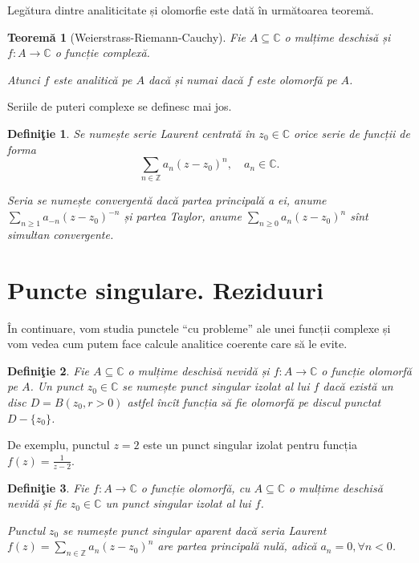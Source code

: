 \documentclass[12pt,a4paper]{article}
\newcommand\qq{\enquote}
\newcommand\seq{\subseteq}
\newcommand\ZZ{\mathbb{Z}}
\newcommand\CC{\mathbb{C}}
\theoremstyle{dotless}
\newtheorem{theorem}{Teorem\u{a}}
\theoremstyle{dotlessdr}
\newtheorem{definition}{Defini\c{t}ie}
\begin{document}
Legătura dintre analiticitate și olomorfie este dată în următoarea teoremă.

\begin{theorem}[Weierstrass-Riemann-Cauchy]\label{thm:wrc}
  Fie $ A \seq \CC $ o mulțime deschisă și $ f : A \to \CC $ o funcție complexă.

  Atunci $ f $ este analitică pe $ A $ dacă și numai dacă $ f $ este olomorfă pe $ A $.
\end{theorem}

Seriile de puteri complexe se definesc mai jos.

\begin{definition}\label{def:laurent}
  Se numește \emph{serie Laurent centrată în $ z_0 \in \CC $} orice serie de funcții
  de forma
  \[
    \sum_{n \in \ZZ} a_n(z - z_0)^n, \quad a_n \in \CC.
  \]

  Seria se numește convergentă dacă \emph{partea principală} a ei, anume
  $ \sum_{n \geq 1} a_{-n}(z - z_0)^{-n} $ și \emph{partea Taylor}, anume
  $ \sum_{n \geq 0} a_n(z - z_0)^n $ sînt simultan convergente.
\end{definition}


\section*{Puncte singulare. Reziduuri}

\indent\indent În continuare, vom studia punctele \qq{cu probleme} ale unei
funcții complexe și vom vedea cum putem face calcule analitice coerente care să le evite.

\begin{definition}\label{def:pc-izolat}
  Fie $ A \seq \CC $ o mulțime deschisă nevidă și $ f : A \to \CC $ o funcție
  olomorfă pe $ A $. Un punct $ z_0 \in \CC $ se numește \emph{punct singular izolat}
  al lui $ f $ dacă există un disc $ D = B(z_0, r > 0) $ astfel încît funcția să
  fie olomorfă pe discul punctat $ D - \{z_0\} $.
\end{definition}

De exemplu, punctul $ z = 2 $ este un punct singular izolat pentru funcția
$ f(z) = \frac{1}{z - 2} $.

\begin{definition}\label{def:pc-sing-ap}
  Fie $ f : A \to \CC $ o funcție olomorfă, cu $ A \seq \CC $ o mulțime deschisă
  nevidă și fie $ z_0 \in \CC $ un punct singular izolat al lui $ f $.

  Punctul $ z_0 $ se numește \emph{punct singular aparent} dacă seria Laurent
  $ f(z) = \sum_{n \in \ZZ } a_n(z - z_0)^n $ are partea principală nulă, adică
  $ a_n = 0, \forall n < 0 $.
\end{definition}
\end{document}
